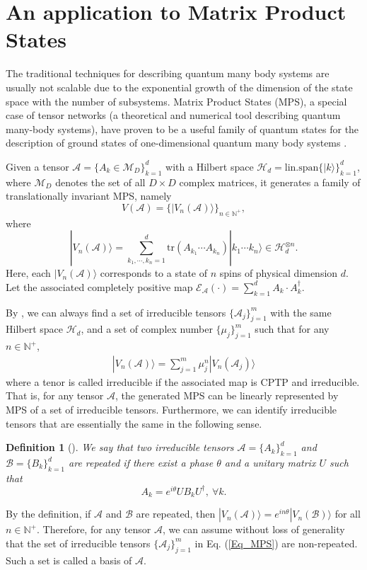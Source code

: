 \documentclass[journal]{IEEEtran}
\def\h{\ensuremath{\mathcal{H}}}
\def\a{\ensuremath{\mathcal{A}}}
\def\b{\ensuremath{\mathcal{B}}}
\def\e{\ensuremath{\mathcal{E}}}
\newtheorem{definition}{Definition}
\begin{document}
\section{An application to Matrix Product States}
The traditional techniques for describing quantum many body systems are usually not scalable due to the exponential growth of the dimension of the state space with the number of subsystems.  Matrix Product States (MPS), a special case of tensor networks (a theoretical and numerical tool describing quantum many-body systems), have proven to be a useful family of quantum states for the description of  ground states of  one-dimensional quantum many body systems \cite{cirac2017matrix}.  

Given a  tensor $\a=\{A_{k}\in \mathcal{M}_D\}_{k=1}^{d}$ with a Hilbert space $\h_d=\textrm{lin.span}\{|k\rangle\}_{k=1}^{d}$, where $\mathcal{M}_{D}$ denotes the set of all $D\times D$ complex matrices, it generates a family of translationally invariant MPS, namely
$$V(\a)=\{|V_{n}(\a)\rangle\}_{n\in \mathbb{N^+}},$$
where $$|V_{n}(\a)\rangle=\sum_{k_1,\cdots,k_n=1}^{d}\textrm{tr}(A_{k_1}\cdots A_{k_n})|k_1\cdots k_{n}\rangle\in\h_d^{\otimes n}.$$
Here, each $|V_{n}(\a)\rangle$ corresponds to a state of $n$ spins of physical dimension $d.$
Let the associated completely positive map $\e_\a(\cdot)=\sum_{k=1}^{d}A_{k}\cdot A_{k}^\dagger$.


By \cite{cuevas2017irreducible}, we can always find a set of irreducible tensors $\{\a_{j}\}_{j=1}^{m}$ with the same Hilbert space  $\h_d$, and a set of complex number $\{\mu_{j}\}_{j=1}^{m}$ such that for any $n\in\mathbb{N^{+}}$,
\begin{eqnarray}\label{Eq_MPS}
  |V_n(\a)\rangle=\sum_{j=1}^{m}\mu_j^{n}|V_n(\a_{j})\rangle
\end{eqnarray}
where a tenor is called irreducible if the associated map is CPTP and irreducible. That is, for any tensor $\a$,  the generated MPS can be linearly represented by MPS of a set of irreducible tensors. Furthermore, we can identify irreducible tensors that are essentially the same in the following sense.
\begin{definition}[\cite{cuevas2017irreducible}]
  We say that two irreducible tensors $\a=\{A_{k}\}_{k=1}^{d}$ and $\b=\{B_{k}\}_{k=1}^{d}$ are repeated if there exist a phase $\theta$ and a unitary matrix $U$ such that 
  $$A_{k}=e^{i\theta}UB_kU^\dagger, \ \forall k.$$
\end{definition}

By the definition, if $\a$ and $\b$ are repeated, then $|V_n(\a)\rangle=e^{in\theta}|V_n(\b)\rangle$ for all $n\in \mathbb{N^+}$. Therefore, for any tensor $\a$, we can assume without loss of generality that the set of irreducible tensors $\{\a_{j}\}_{j=1}^{m}$ in Eq. (\ref{Eq_MPS}) are non-repeated. Such a set is called a basis of $\a$. 
\end{document}
